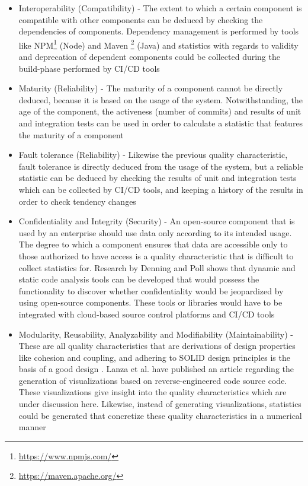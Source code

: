\documentclass[a4paper, 10pt, conference]{ieeeconf}
\begin{document}
\begin{itemize}
  \item Interoperability (Compatibility) - The extent to which a certain component is compatible with other components can be deduced by checking the dependencies of components. Dependency management is performed by tools like NPM\footnote{\url{https://www.npmjs.com/}} (Node) and Maven \footnote{\url{https://maven.apache.org/}} (Java) and statistics with regards to validity and deprecation of dependent components could be collected during the build-phase performed by CI/CD tools
  \item Maturity (Reliability) - The maturity of a component cannot be directly deduced, because it is based on the usage of the system. Notwithstanding, the age of the component, the activeness (number of commits) and results of unit and integration tests can be used in order to calculate a statistic that features the maturity of a component
  \item Fault tolerance (Reliability) - Likewise the previous quality characteristic, fault tolerance is directly deduced from the usage of the system, but a reliable statistic can be deduced by checking the results of unit and integration tests which can be collected by CI/CD tools, and keeping a history of the results in order to check tendency changes
  \item Confidentiality and Integrity (Security) - An open-source component that is used by an enterprise should use data only according to its intended usage. The degree to which a component ensures that data are accessible only to those authorized to have access is a quality characteristic that is difficult to collect statistics for. Research by Denning \cite{denning1977} and Poll \cite{poll2017} shows that dynamic and static code analysis tools can be developed that would possess the functionality to discover whether confidentiality would be jeopardized by using open-source components. These tools or libraries would have to be integrated with cloud-based source control platforms and CI/CD tools
  \item Modularity, Reusability, Analyzability and Modifiability (Maintainability) - These are all quality characteristics that are derivations of design properties like cohesion and coupling, and adhering to SOLID design principles is the basis of a good design \cite{wikisolid}. Lanza et al. \cite{Lanza2004} have published an article regarding the generation of visualizations based on reverse-engineered code source code. These visualizations give insight into the quality characteristics which are under discussion here. Likewise, instead of generating visualizations, statistics could be generated that concretize these quality characteristics in a numerical manner

\end{itemize}
\end{document}
